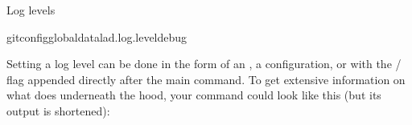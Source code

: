 \begin{findoutmore}[label={fom-loglevels}, before title={\thetcbcounter\ }, float, floatplacement=tbp, check odd page=true]{Log levels}
\begin{sphinxVerbatim}[commandchars=\\\{\}]
gitconfig\PYGZhy{}\PYGZhy{}globaldatalad.log.leveldebug
\end{sphinxVerbatim}


\end{findoutmore}

\sphinxAtStartPar
Setting a log level can be done in the form of an {\hyperref[\detokenize{glossary:term-environment-variable}]{}}, a configuration, or with the / flag appended directly after the main  command.
To get extensive information on what  does underneath the hood, your command could look like this (but its output is shortened):

